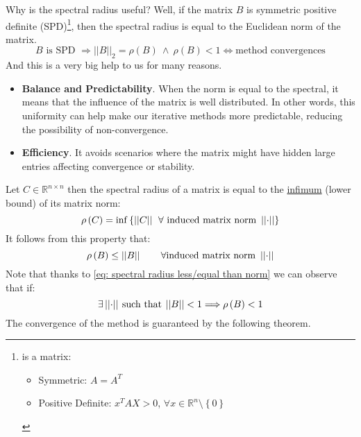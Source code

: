 \begin{itemize}
\begin{itemize}
        Why is the spectral radius useful? Well, if the matrix $B$ is symmetric positive definite (SPD)\footnote{ is a matrix: \begin{itemize}
            \item Symmetric: $A = A^{T}$
            \item Positive Definite: $x^{T}AX > 0$, $\forall x \in \mathbb{R}^{n} \setminus \left\{0\right\}$
        \end{itemize}}, then the spectral radius is equal to the Euclidean norm of the matrix.
        \begin{equation*}
            B \text{ is SPD } \Rightarrow {\left|\left|B\right|\right|}_{2} = \rho\left(B\right) \: \land \: \rho\left(B\right) < 1 \iff \text{method convergences}
        \end{equation*}
        And this is a very big help to us for many reasons.
        \begin{itemize}
            \item \textbf{Balance and Predictability}. When the norm is equal to the spectral, it means that the influence of the matrix is well distributed. In other words, this uniformity can help make our iterative methods more predictable, reducing the possibility of non-convergence.

            \item \textbf{Efficiency}. It avoids scenarios where the matrix might have hidden large entries affecting convergence or stability.
        \end{itemize}   
    \end{itemize}
\end{itemize}
\newpage
\noindent
Let $C \in \mathbb{R}^{n \times n}$ then the spectral radius of a matrix is equal to the \href{https://en.wikipedia.org/wiki/Infimum_and_supremum}{infimum} (lower bound) of its matrix norm:
\begin{equation}
    \rho\left(C\right) = \mathrm{inf}\left\{ \left|\left|C\right|\right| \:\: \forall \text{ induced matrix norm }\left|\left|\cdot\right|\right|\right\}
\end{equation}
It follows from this property that:
\begin{equation}\label{eq: spectral radius less/equal than norm}
    \rho\left(B\right) \le \left|\left|B\right|\right| \hspace{2em} \forall \text{induced matrix norm } \left|\left|\cdot\right|\right|
\end{equation}
Note that thanks to \ref{eq: spectral radius less/equal than norm} we can observe that if:
\begin{equation*}
    \exists \left|\left|\cdot\right|\right| \: \text{such that} \: \left|\left|B\right|\right| < 1 \Longrightarrow \rho\left(B\right) < 1
\end{equation*}
The convergence of the method is guaranteed by the following theorem.

